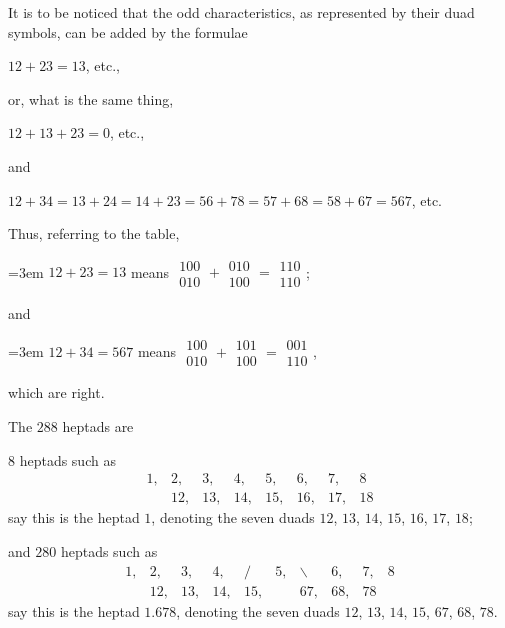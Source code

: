 \documentclass[12pt,a4paper]{article}
\theoremstyle{definition}
\begin{document}
It is to be noticed that the odd characteristics, as represented by their duad symbols, can be added by the formulae

$12 + 23 = 13$, etc.,

or, what is the same thing,

$12 + 13 + 23 = 0$, etc.,

and

$12 + 34 = 13 + 24 = 14 + 23 = 56 + 78 = 57 + 68 = 58 + 67 = 567$, etc.

Thus, referring to the table,

\noindent\hangindent=3em $12 + 23 = 13$ means
$\begin{matrix} 100 \\ 010 \end{matrix} +
\begin{matrix} 010 \\ 100 \end{matrix} =
\begin{matrix} 110 \\ 110 \end{matrix}$;

\noindent and

\noindent\hangindent=3em $12 + 34 = 567$ means
$\begin{matrix} 100 \\ 010 \end{matrix} +
\begin{matrix} 101 \\ 100 \end{matrix} =
\begin{matrix} 001 \\ 110 \end{matrix}$,

\noindent which are right.

The $288$ heptads are

\noindent $8$ heptads such as
\[
\begin{matrix} 1, & 2, & 3, & 4, & 5, & 6, & 7, & 8 \\ & 12, & 13, & 14, & 15, & 16, & 17, & 18 \end{matrix}
\]
say this is the heptad $1$, denoting the seven duads $12$, $13$, $14$, $15$, $16$, $17$, $18$;

and $280$ heptads such as
\[
\begin{matrix} 1, & 2, & 3, & 4, & / & 5, & \backslash & 6, & 7, & 8 \\ & 12, & 13, & 14, & 15, & & 67, & 68, & 78 \end{matrix}
\]
say this is the heptad $1.678$, denoting the seven duads $12$, $13$, $14$, $15$, $67$, $68$, $78$.
\end{document}
